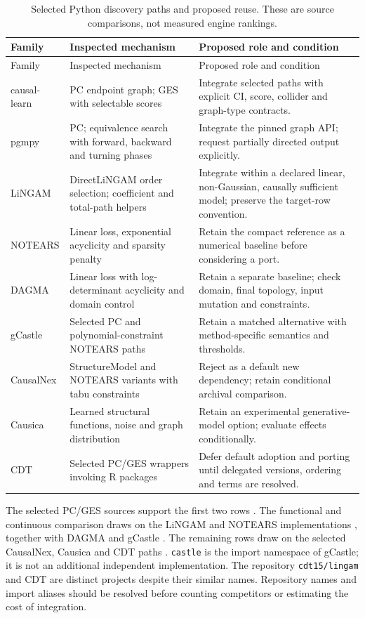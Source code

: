 \begingroup\small
\begin{longtable}{P{0.16\textwidth}P{0.36\textwidth}P{0.40\textwidth}}
\caption{Selected Python discovery paths and proposed reuse. These are source
comparisons, not measured engine rankings.}\label{tab:exec13-pydisc}\\
\toprule Family & Inspected mechanism & Proposed role and condition \\
\midrule\endfirsthead
\toprule Family & Inspected mechanism & Proposed role and condition \\
\midrule\endhead
causal-learn & PC endpoint graph; GES with selectable scores & Integrate selected
paths with explicit CI, score, collider and graph-type contracts. \\
pgmpy & PC; equivalence search with forward, backward and turning phases &
Integrate the pinned graph API; request partially directed output explicitly. \\
LiNGAM & DirectLiNGAM order selection; coefficient and total-path helpers &
Integrate within a declared linear, non-Gaussian, causally sufficient model;
preserve the target-row convention. \\
NOTEARS & Linear loss, exponential acyclicity and sparsity penalty & Retain
the compact reference as a numerical baseline before considering a port. \\
DAGMA & Linear loss with log-determinant acyclicity and domain control & Retain
a separate baseline; check domain, final topology, input mutation and constraints. \\
gCastle & Selected PC and polynomial-constraint NOTEARS paths & Retain a
matched alternative with method-specific semantics and thresholds. \\
CausalNex & StructureModel and NOTEARS variants with tabu constraints & Reject
as a default new dependency; retain conditional archival comparison. \\
Causica & Learned structural functions, noise and graph distribution & Retain
an experimental generative-model option; evaluate effects conditionally. \\
CDT & Selected PC/GES wrappers invoking R packages & Defer default adoption
and porting until delegated versions, ordering and terms are resolved. \\
\bottomrule
\end{longtable}
\endgroup

The selected PC/GES sources support the first two rows
\citep{exec13_pydisc_causallearn,exec13_pydisc_pgmpy}.
The functional and continuous comparison draws on the LiNGAM and NOTEARS
implementations \citep{exec13_pydisc_lingam,exec13_pydisc_notears}, together
with DAGMA and gCastle \citep{exec13_pydisc_dagma,exec13_pydisc_gcastle}.
The remaining rows draw on the selected CausalNex, Causica and CDT paths
\citep{exec13_pydisc_causalnex,exec13_pydisc_causica,exec13_pydisc_cdt}.
\texttt{castle} is the import namespace of gCastle; it is not an additional
independent implementation. The repository \texttt{cdt15/lingam} and CDT are
distinct projects despite their similar names. Repository names and import
aliases should be resolved before counting competitors or estimating the
cost of integration.

